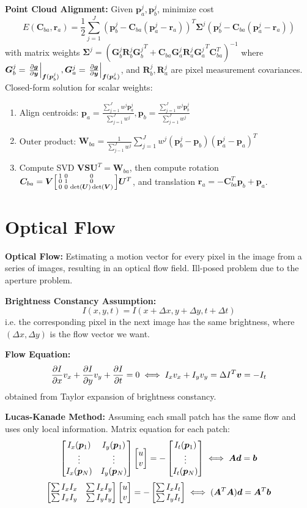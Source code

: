 \documentclass[twocolumn, 10pt]{extarticle}
\begin{document}
\textbf{Point Cloud Alignment:} Given \(\bm p_a^j, \bm p_b^j\), minimize cost
\[E(\bm C_{ba}, \bm r_a) = \frac{1}{2}\sum _{j = 1}^J \left(\bm p_b^j - \bm C_{ba}(\bm p_a^j - \bm r_a)\right)^T\bm\Sigma^j\left(\bm p_b^j - \bm C_{ba}(\bm p_a^j - \bm r_a)\right)\]
with matrix weights \(\bm\Sigma^j = \left(\bm G_b^j\bm R_b^j{\bm G_b^j}^T + \bm C_{ba}\bm G_a^j\bm R_a^j{\bm G_a^j}^T\bm C_{ba}^T\right)^{-1}\)
where \(\bm G_b^j = \left.\frac{\partial\bm g}{\partial\bm y}\right\rvert_{\bm f(\bm p_b^j)}, \bm G_a^j = \left.\frac{\partial\bm g}{\partial\bm y}\right\rvert_{\bm f(\bm p_a^j)}\), and $\bm R_b^j, \bm R_a^j$ are pixel measurement covariances.
Closed-form solution for scalar weights:
\begin{enumerate}
	\item Align centroids: $\displaystyle\bm p_a = \frac{\sum _{j = 1}^J w^j\bm p_a^j}{\sum _{j = 1}^J w^j}, \bm p_b = \frac{\sum _{j = 1}^J w^j\bm p_b^j}{\sum _{j = 1}^J w^j}$
	\item Outer product: $\displaystyle\bm W_{ba} = \frac{1}{\sum _{j - 1}^J w^j}\sum _{j = 1}^J w^j(\bm p_b^j - \bm p_b)(\bm p_a^j - \bm p_a)^T$
	\item Compute SVD $\bm V\bm S\bm U^T = \bm W_{ba}$, then compute rotation \(\bm C_{ba} = \bm V\matthree[bsmall]{1}{0}{0}{0}{1}{0}{0}{0}{\det(\bm U)\det(\bm V)}\bm U^T\),
          and translation \(\bm r_a = -\bm C_{ba}^T\bm p_b + \bm p_a\).
\end{enumerate}

\section{Optical Flow} %

\textbf{Optical Flow:} Estimating a motion vector for every pixel in the image from a series of images, resulting in an
optical flow field. Ill-posed problem due to the aperture problem.

\textbf{Brightness Constancy Assumption:} \[I(x, y, t) = I(x + \Delta x, y + \Delta y, t + \Delta t)\]
i.e. the corresponding pixel in the next image has the same brightness, where \((\Delta x, \Delta y)\) is the flow vector we want.

\textbf{Flow Equation:} \[\frac{\partial I}{\partial x}v_x + \frac{\partial I}{\partial y}v_y + \frac{\partial I}{\partial t} = 0 \iff I_xv_x + I_yv_y = \Delta I^T\bm v = -I_t\]
obtained from Taylor expansion of brightness constancy.

\textbf{Lucas-Kanade Method:} Assuming each small patch has the same flow and uses only local information.
Matrix equation for each patch:
\[\matthreetwo{I_x(\bm p_1)}{I_y(\bm p_1)}{\vdots}{\vdots}{I_x(\bm p_N)}{I_y(\bm p_N)}\cvec{u}{v} = -\cvec{I_t(\bm p_1)}{\vdots}{I_t(\bm p_N)} \iff \bm A\bm d = \bm b\]
\[\mattwo{\sum I_xI_x}{\sum I_xI_y}{\sum I_xI_y}{\sum I_yI_y}\cvec{u}{v} = -\cvec{\sum I_xI_t}{\sum I_yI_t} \iff (\bm A^T\bm A)\bm d = \bm A^T\bm b\]
\end{document}
